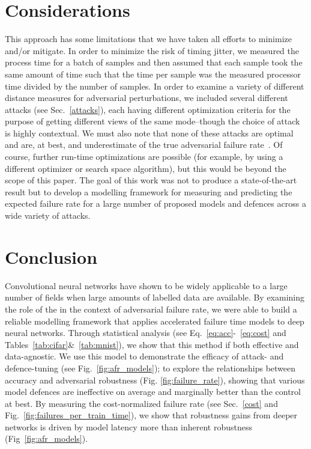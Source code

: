 \textit{}\section{Considerations}
This approach has some limitations that we have taken all efforts to minimize and/or mitigate. In order to minimize the risk of timing jitter, we measured the process time for a batch of samples and then assumed that each sample took the same amount of time such that the time per sample was the measured processor time divided by the number of samples. In order to examine a variety of different distance measures for adversarial perturbations, we included several different attacks (see Sec.~\ref{attacks}), each having different optimization criteria for the purpose of getting different views of the same mode--though the choice of attack is highly contextual. We must also note that none of these attacks are optimal and are, at best, and underestimate of the true adversarial failure rate~\citep{meyers}. Of course, further run-time optimizations are possible (for example, by using a different optimizer or search space algorithm), but this would be beyond the scope of this paper. The goal of this work was not to produce a state-of-the-art result but to develop a modelling framework for measuring and predicting the expected failure rate for a large number of proposed models and defences across a wide variety of attacks.

\section{Conclusion}
Convolutional neural networks have shown to be widely applicable to a large number of fields when large amounts of labelled data are available. By examining the role of the  in the context of adversarial failure rate, we were able to build a reliable  modelling framework that applies accelerated failure time models to deep neural networks. Through statistical analysis (see Eq.~\ref{eq:acc}-~\ref{eq:cost} and Tables~\ref{tab:cifar}\&~\ref{tab:mnist}), we show that this method if both effective and data-agnostic.  We use this model to demonstrate the efficacy of attack- and defence-tuning (see Fig.~\ref{fig:afr_models}); to  explore the relationships between accuracy and adversarial robustness (Fig. \ref{fig:failure_rate}), showing that various model defences are ineffective on average and marginally better than the control at best.
By measuring the cost-normalized failure rate (see Sec.~\ref{cost} and Fig.~\ref{fig:failures_per_train_time}), we show that robustness gains from deeper networks is driven by model latency more than inherent robustness (Fig~\ref{fig:afr_models}). 
